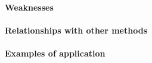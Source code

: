 \paragraph{Weaknesses}
\paragraph{Relationships with other methods}
\paragraph{Examples of application}


